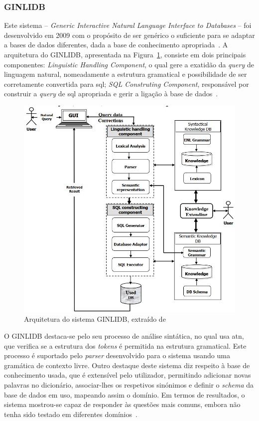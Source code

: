 \subsubsection*{GINLIDB}
Este sistema -- \textit{Generic Interactive Natural Language Interface to Databases} -- foi desenvolvido em 2009 com o propósito de ser genérico o suficiente para se adaptar a bases de dados diferentes, dada a base de conhecimento apropriada~\parencite{ginlidb}. A arquitetura do GINLIDB, apresentada na Figura~\ref{fig:ginlidb_architecture}, consiste em dois principais componentes: \textit{Linguistic Handling Component}, o qual gere a exatidão da \textit{query} de linguagem natural, nomeadamente a estrutura gramatical e possibilidade de ser corretamente convertida para \gls{sql}; \textit{SQL Construting Component}, responsável por construir a \textit{query} de \gls{sql} apropriada e gerir a ligação à base de dados~\parencite{ginlidb}.
%
\begin{figure}
    \centering
    \includegraphics[width=.8\textwidth]{ch03/assets/ginlidb_architecture.jpg}
    \caption{Arquitetura do sistema GINLIDB, extraído de~\textcite{ginlidb}}
    \label{fig:ginlidb_architecture}
\end{figure}

O GINLIDB destaca-se pelo seu processo de análise sintática, no qual usa \gls{atn}, que verifica se a estrutura dos \textit{tokens} é permitida na estrutura gramatical. Este processo é suportado pelo \textit{parser} desenvolvido para o sistema usando uma gramática de contexto livre. Outro destaque deste sistema diz respeito à base de conhecimento usada, que é extensível pelo utilizador, permitindo adicionar novas palavras no dicionário, associar-lhes os respetivos sinónimos e definir o \textit{schema} da base de dados em uso, mapeando assim o domínio. Em termos de resultados, o sistema mostrou-se capaz de responder às questões mais comuns, embora não tenha sido testado em diferentes domínios~\parencite{ginlidb}.

